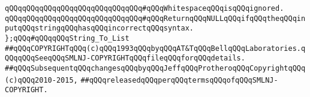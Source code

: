 \verb|qQQqqQQqqQQqqQQqqQQqqQQqqQQqqQQq#qQQqWhitespaceqQQqisqQQqignored.|\newline
\verb|qQQqqQQqqQQqqQQqqQQqqQQqqQQqqQQq#qQQqReturnqQQqNULLqQQqifqQQqtheqQQqinputqQQqstringqQQqhasqQQqincorrectqQQqsyntax.|\newline
\newline
\newline
\verb|};qQQq#qQQqqQQqString_To_List|\newline
\newline
\newline
\verb|##qQQqCOPYRIGHTqQQq(c)qQQq1993qQQqbyqQQqAT&TqQQqBellqQQqLaboratories.qQQqqQQqSeeqQQqSMLNJ-COPYRIGHTqQQqfileqQQqforqQQqdetails.|\newline
\verb|##qQQqSubsequentqQQqchangesqQQqbyqQQqJeffqQQqProtheroqQQqCopyrightqQQq(c)qQQq2010-2015,|\newline
\verb|##qQQqreleasedqQQqperqQQqtermsqQQqofqQQqSMLNJ-COPYRIGHT.|\newline

